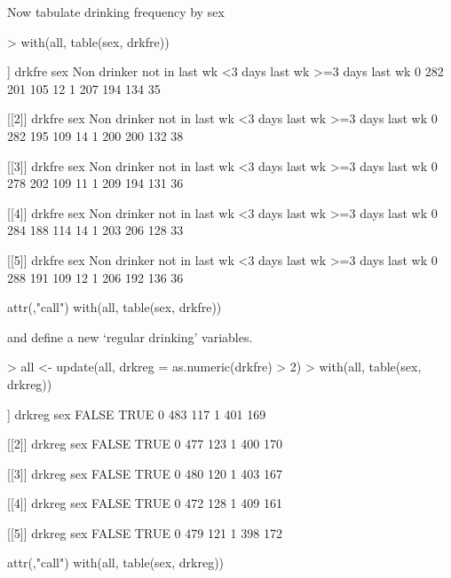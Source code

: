 \documentclass[12pt]{article}
\begin{document}
Now tabulate drinking frequency by sex
\begin{Schunk}
\begin{Sinput}
> with(all, table(sex, drkfre))
\end{Sinput}
\begin{Soutput}
[[1]]
   drkfre
sex Non drinker not in last wk <3 days last wk >=3 days last wk
  0         282            201             105               12
  1         207            194             134               35

[[2]]
   drkfre
sex Non drinker not in last wk <3 days last wk >=3 days last wk
  0         282            195             109               14
  1         200            200             132               38

[[3]]
   drkfre
sex Non drinker not in last wk <3 days last wk >=3 days last wk
  0         278            202             109               11
  1         209            194             131               36

[[4]]
   drkfre
sex Non drinker not in last wk <3 days last wk >=3 days last wk
  0         284            188             114               14
  1         203            206             128               33

[[5]]
   drkfre
sex Non drinker not in last wk <3 days last wk >=3 days last wk
  0         288            191             109               12
  1         206            192             136               36

attr(,"call")
with(all, table(sex, drkfre))
\end{Soutput}
\end{Schunk}
and define a new `regular drinking' variables.
\begin{Schunk}
\begin{Sinput}
> all <- update(all, drkreg = as.numeric(drkfre) > 2)
> with(all, table(sex, drkreg))
\end{Sinput}
\begin{Soutput}
[[1]]
   drkreg
sex FALSE TRUE
  0   483  117
  1   401  169

[[2]]
   drkreg
sex FALSE TRUE
  0   477  123
  1   400  170

[[3]]
   drkreg
sex FALSE TRUE
  0   480  120
  1   403  167

[[4]]
   drkreg
sex FALSE TRUE
  0   472  128
  1   409  161

[[5]]
   drkreg
sex FALSE TRUE
  0   479  121
  1   398  172

attr(,"call")
with(all, table(sex, drkreg))
\end{Soutput}
\end{Schunk}
\end{document}
